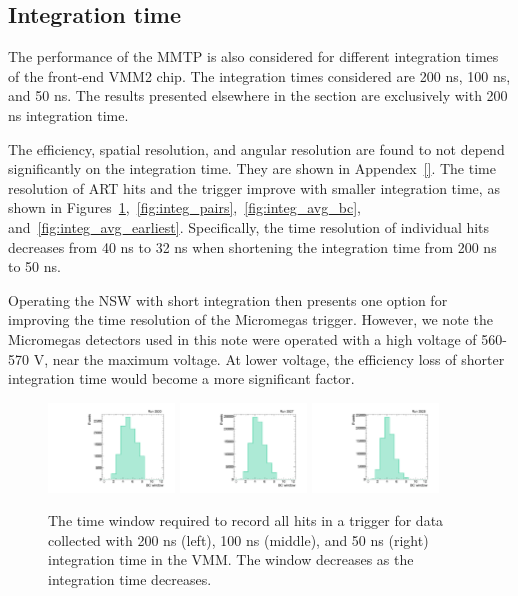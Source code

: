 \subsection{Integration time}
\label{sec:perf-integ}

The performance of the MMTP is also considered for different integration times of the front-end VMM2 chip. The integration times considered are 200 ns, 100 ns, and 50 ns. The results presented elsewhere in the section are exclusively with 200 ns integration time.

The efficiency, spatial resolution, and angular resolution are found to not depend significantly on the integration time. They are shown in Appendex~\ref{}. The time resolution of ART hits and the trigger improve with smaller integration time, as shown in Figures~\ref{fig:integ_window},~\ref{fig:integ_pairs},~\ref{fig:integ_avg_bc}, and~\ref{fig:integ_avg_earliest}. Specifically, the time resolution of individual hits decreases from 40 ns to 32 ns when shortening the integration time from 200 ns to 50 ns.

Operating the NSW with short integration then presents one option for improving the time resolution of the Micromegas trigger. However, we note the Micromegas detectors used in this note were operated with a high voltage of 560-570 V, near the maximum voltage. At lower voltage, the efficiency loss of shorter integration time would become a more significant factor.

\begin{figure}[!htpb]
  \begin{center}
    \includegraphics[width=0.3\textwidth]{figures/gbtanalysis3530/artwin_lin.pdf}
    \includegraphics[width=0.3\textwidth]{figures/gbtanalysis3527/artwin_lin.pdf}
    \includegraphics[width=0.3\textwidth]{figures/gbtanalysis3528/artwin_lin.pdf}
  \end{center}
  \vspace{-10pt}
  \caption{The time window required to record all hits in a trigger for data collected with 200 ns (left), 100 ns (middle), and 50 ns (right) integration time in the VMM. The window decreases as the integration time decreases.}
  \label{fig:integ_window}
\end{figure}

